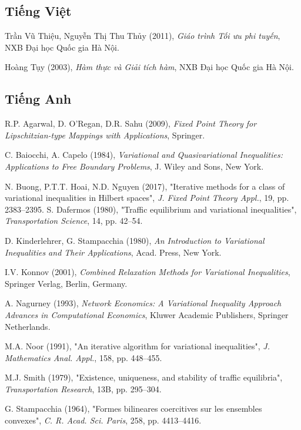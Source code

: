 \documentclass[14pt, oneside,A4paper]{book}
\theoremstyle{plain}
\begin{document}
\begin{thebibliography}{99}\rm
	
	\subsection*{Tiếng Việt}
	
	 Trần Vũ Thiệu, Nguyễn Thị Thu Thủy (2011), {\it Giáo trình Tối ưu phi tuyến}, NXB Đại học Quốc gia Hà Nội. 
	
	 Hoàng Tụy (2003), {\it Hàm thực và Giải tích hàm}, NXB Đại học Quốc gia Hà Nội.
	
	\subsection*{Tiếng Anh}
	
	 R.P. Agarwal, D. O’Regan, D.R. Sahu (2009), {\it Fixed Point Theory for Lipschitzian-type Mappings with Applications}, Springer.
	
	 C. Baiocchi, A. Capelo (1984), {\it Variational and Quasivariational Inequalities: Applications to Free Boundary Problems}, J. Wiley and Sons, New York.
	
	 N. Buong, P.T.T. Hoai, N.D. Nguyen (2017), "Iterative methods for a class of variational inequalities in Hilbert spaces", {\it J. Fixed Point Theory Appl.}, 19, pp. 2383--2395.
	 S. Dafermos (1980), {"Traffic equilibrium and variational inequalities"}, {\it Transportation Science}, 14,  pp. 42--54.
	
	 D. Kinderlehrer, G. Stampacchia  (1980), {\it An Introduction to Variational Inequalities and Their Applications}, Acad. Press, New York.
	
	 I.V. Konnov (2001), {\it Combined Relaxation Methods for Variational Inequalities}, Springer Verlag, Berlin, Germany.
	
	 A. Nagurney  (1993), {\it Network Economics: A Variational Inequality Approach Advances in Computational Economics}, Kluwer Academic Publishers, Springer Netherlands.
	
	 M.A. Noor (1991), "An iterative algorithm for variational inequalities", {\it J. Mathematics Anal. Appl.}, 158, pp. 448--455.

	
	  M.J. Smith (1979), {"Existence, uniqueness, and stability of traffic equilibria"}, {\it Transportation Research}, 13B, pp. 295--304.
	 
	  G. Stampacchia (1964), {"Formes bilineares coercitives sur les ensembles convexes"}, {\it C. R. Acad. Sci. Paris}, 258, pp. 4413--4416.
	

\end{thebibliography}
\end{document}
